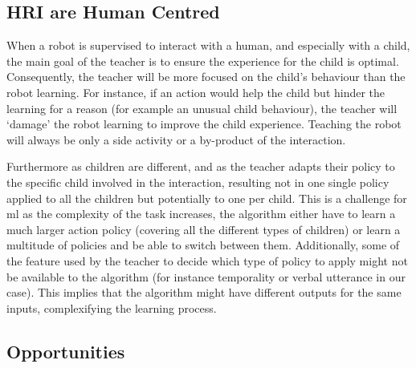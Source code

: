 \subsection{HRI are Human Centred}

When a robot is supervised to interact with a human, and especially with a child, the main goal of the teacher is to ensure the experience for the child is optimal. Consequently, the teacher will be more focused on the child's behaviour than the robot learning. For instance, if an action would help the child but hinder the learning for a reason (for example an unusual child behaviour), the teacher will `damage' the robot learning to improve the child experience. Teaching the robot will always be only a side activity or a by-product of the interaction. 

Furthermore as children are different, and as the teacher adapts their policy to the specific child involved in the interaction, resulting not in one single policy applied to all the children but potentially to one per child. This is a challenge for \gls{ml} as the complexity of the task increases, the algorithm either have to learn a much larger action policy (covering all the different types of children) or learn a multitude of policies and be able to switch between them. Additionally, some of the feature used by the teacher to decide which type of policy to apply might not be available to the algorithm (for instance temporality or verbal utterance in our case). This implies that the algorithm might have different outputs for the same inputs, complexifying the learning process.


\subsection{Opportunities} \label{sec:tutoring_opportunities}

